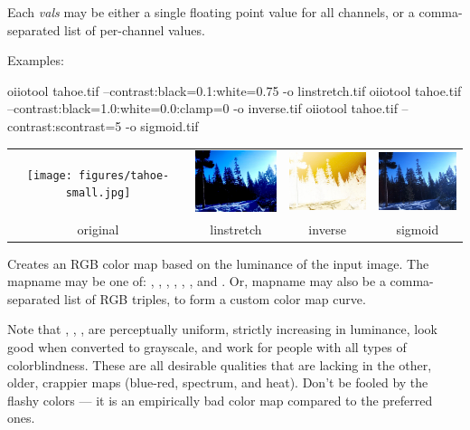 \noindent Each \emph{vals} may be either a single floating point value
for all channels, or a comma-separated list of per-channel values.

\noindent Examples:
\begin{code}
    oiiotool tahoe.tif --contrast:black=0.1:white=0.75 -o linstretch.tif
    oiiotool tahoe.tif --contrast:black=1.0:white=0.0:clamp=0 -o inverse.tif
    oiiotool tahoe.tif --contrast:scontrast=5 -o sigmoid.tif
\end{code}

\noindent \begin{tabular}{cccc}
\texttt{[image: figures/tahoe-small.jpg]} &
\includegraphics[width=1.1in]{figures/tahoe-lincontrast.jpg} &
\includegraphics[width=1.1in]{figures/tahoe-inverse.jpg} &
\includegraphics[width=1.1in]{figures/tahoe-sigmoid.jpg} \\
original & linstretch & inverse & sigmoid \\
\end{tabular}
\apiend


Creates an RGB color map based on the luminance of the input image. The
{\cf mapname} may be one of: , , ,
, , , and .
Or, {\cf mapname} may also be a comma-separated list of RGB triples, to form
a custom color map curve.

Note that , , ,  are
perceptually uniform, strictly increasing in luminance, look good when
converted to grayscale, and work for people with all types of
colorblindness. These are all desirable qualities that are lacking in the
other, older, crappier maps (blue-red, spectrum, and heat). Don't be fooled
by the flashy  colors --- it is an empirically bad color map
compared to the preferred ones.


